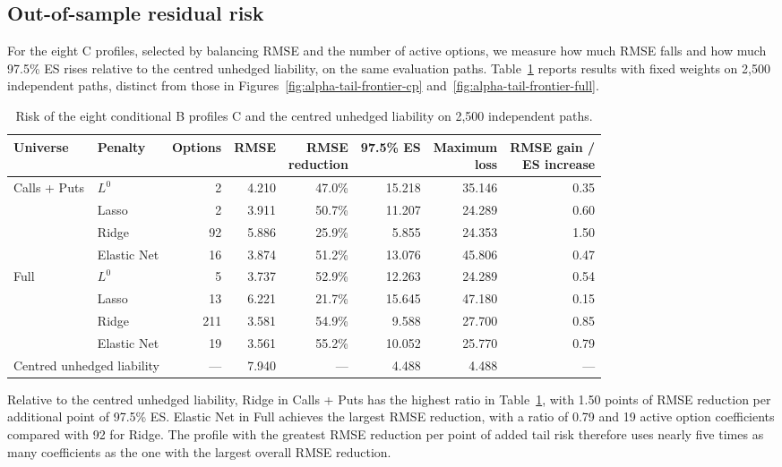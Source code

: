 \documentclass[12pt,a4paper]{article}
\newcommand{\ES}{\operatorname{ES}}
\newcommand{\1}{\mathbf{1}}
\begin{document}
\FloatBarrier

\subsection{Out-of-sample residual risk}\label{sec:out-of-sample-risk}

For the eight C profiles, selected by balancing RMSE and the number of active options, we measure how much RMSE falls and how much 97.5\% ES rises relative to the centred unhedged liability, on the same evaluation paths. Table~\ref{tab:risk} reports results with fixed weights on 2,500 independent paths, distinct from those in Figures~\ref{fig:alpha-tail-frontier-cp} and~\ref{fig:alpha-tail-frontier-full}.

\begin{table}[H]
\centering
\small
\setlength{\tabcolsep}{3pt}
\begin{tabular}{llrrrrrr}
\toprule
Universe & Penalty & Options & RMSE & \shortstack[r]{RMSE\\reduction} & 97.5\% ES & \shortstack[r]{Maximum\\loss} & \shortstack[r]{RMSE gain /\\ES increase} \\
\midrule
Calls + Puts & $L^0$ & 2 & 4.210 & 47.0\% & 15.218 & 35.146 & 0.35 \\
 & Lasso & 2 & 3.911 & 50.7\% & 11.207 & 24.289 & 0.60 \\
 & Ridge & 92 & 5.886 & 25.9\% & 5.855 & 24.353 & 1.50 \\
 & Elastic Net & 16 & 3.874 & 51.2\% & 13.076 & 45.806 & 0.47 \\
\addlinespace[2pt]
Full & $L^0$ & 5 & 3.737 & 52.9\% & 12.263 & 24.289 & 0.54 \\
 & Lasso & 13 & 6.221 & 21.7\% & 15.645 & 47.180 & 0.15 \\
 & Ridge & 211 & 3.581 & 54.9\% & 9.588 & 27.700 & 0.85 \\
 & Elastic Net & 19 & 3.561 & 55.2\% & 10.052 & 25.770 & 0.79 \\
\midrule
\multicolumn{2}{l}{Centred unhedged liability} & --- & 7.940 & --- & 4.488 & 4.488 & --- \\
\bottomrule
\end{tabular}
\caption{Risk of the eight conditional B profiles C and the centred unhedged liability on 2,500 independent paths.}
\label{tab:risk}
\end{table}

Relative to the centred unhedged liability, Ridge in Calls + Puts has the highest ratio in Table~\ref{tab:risk}, with 1.50 points of RMSE reduction per additional point of 97.5\% ES. Elastic Net in Full achieves the largest RMSE reduction, with a ratio of 0.79 and 19 active option coefficients compared with 92 for Ridge. The profile with the greatest RMSE reduction per point of added tail risk therefore uses nearly five times as many coefficients as the one with the largest overall RMSE reduction.
\end{document}
